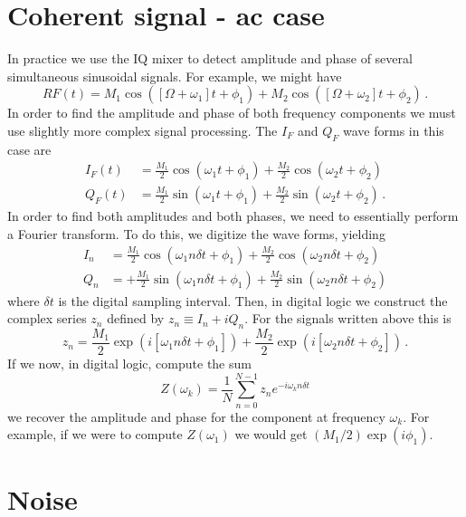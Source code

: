 \section{Coherent signal - ac case}

In practice we use the IQ mixer to detect amplitude and phase of several simultaneous sinusoidal signals.
For example, we might have
\begin{equation}
RF(t) = M_1 \cos([\Omega + \omega_1] t + \phi_1 ) + M_2 \cos([\Omega + \omega_2] t + \phi_2) \, .
\end{equation}
In order to find the amplitude and phase of both frequency components we must use slightly more complex signal processing.
The $I_F$ and $Q_F$ wave forms in this case are
\begin{align}
I_F(t) &= \frac{M_1}{2} \cos(\omega_1 t + \phi_1) + \frac{M_2}{2} \cos(\omega_2 t + \phi_2) \\
Q_F(t) &= \frac{M_1}{2} \sin(\omega_1 t + \phi_1) + \frac{M_2}{2} \sin(\omega_2 t + \phi_2) \, .
\end{align}
In order to find both amplitudes and both phases, we need to essentially perform a Fourier transform.
To do this, we digitize the wave forms, yielding
\begin{align}
I_n &= \frac{M_1}{2} \cos(\omega_1 n \delta t + \phi_1) + \frac{M_2}{2} \cos(\omega_2 n \delta t + \phi_2) \\
Q_n &= + \frac{M_1}{2} \sin(\omega_1 n \delta t + \phi_1) + \frac{M_2}{2} \sin(\omega_2 n \delta t + \phi_2)
\end{align}
where $\delta t$ is the digital sampling interval.
Then, in digital logic we construct the complex series $z_n$ defined by $z_n \equiv I_n + i Q_n$.
For the signals written above this is
\begin{equation}
z_n =
\frac{M_1}{2} \exp \left( i \left[ \omega_1 n \delta t + \phi_1 \right] \right)
+ \frac{M_2}{2} \exp \left( i \left[ \omega_2 n \delta t + \phi_2 \right] \right) \, .
\end{equation}
If we now, in digital logic, compute the sum
\begin{equation}
Z(\omega_k) = \frac{1}{N}\sum_{n=0}^{N-1} z_n e^{-i \omega_k n \delta t}
\end{equation}
we recover the amplitude and phase for the component at frequency $\omega_k$.
For example, if we were to compute $Z(\omega_1)$ we would get $(M_1/2) \exp(i \phi_1)$.


\section{Noise}

